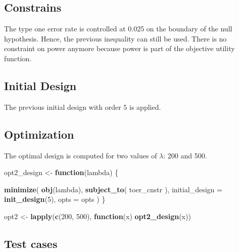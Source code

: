 \documentclass[]{book}
\newenvironment{Shaded}{\begin{snugshade}}{\end{snugshade}}
\newcommand{\ControlFlowTok}[1]{\textcolor[rgb]{0.13,0.29,0.53}{\textbf{#1}}}
\newcommand{\DataTypeTok}[1]{\textcolor[rgb]{0.13,0.29,0.53}{#1}}
\newcommand{\DecValTok}[1]{\textcolor[rgb]{0.00,0.00,0.81}{#1}}
\newcommand{\KeywordTok}[1]{\textcolor[rgb]{0.13,0.29,0.53}{\textbf{#1}}}
\newcommand{\NormalTok}[1]{#1}
\newcommand{\StringTok}[1]{\textcolor[rgb]{0.31,0.60,0.02}{#1}}
\begin{document}
\hypertarget{constrains-11}{%
\subsection{Constrains}\label{constrains-11}}

The type one error rate is controlled at 0.025 on the boundary of the
null hypothesis. Hence, the previous inequality can still be used.
There is no constraint on power anymore because power is part of the
objective utility function.

\hypertarget{initial-design-9}{%
\subsection{Initial Design}\label{initial-design-9}}

The previous initial design with order \(5\) is applied.

\hypertarget{optimization-10}{%
\subsection{Optimization}\label{optimization-10}}

The optimal design is computed for two values of \(\lambda\): 200 and 500.

\begin{Shaded}
\begin{Highlighting}[]
\NormalTok{opt2_design <-}\StringTok{ }\ControlFlowTok{function}\NormalTok{(lambda) \{}

    \KeywordTok{minimize}\NormalTok{(}
        \KeywordTok{obj}\NormalTok{(lambda),}
        \KeywordTok{subject_to}\NormalTok{(}
\NormalTok{            toer_cnstr}
\NormalTok{        ),}
        \DataTypeTok{initial_design =} \KeywordTok{init_design}\NormalTok{(}\DecValTok{5}\NormalTok{),}
        \DataTypeTok{opts =}\NormalTok{ opts}
\NormalTok{    )}
\NormalTok{\}}

\NormalTok{opt2 <-}\StringTok{ }\KeywordTok{lapply}\NormalTok{(}\KeywordTok{c}\NormalTok{(}\DecValTok{200}\NormalTok{, }\DecValTok{500}\NormalTok{), }\ControlFlowTok{function}\NormalTok{(x) }\KeywordTok{opt2_design}\NormalTok{(x))}
\end{Highlighting}
\end{Shaded}

\hypertarget{test-cases-11}{%
\subsection{Test cases}\label{test-cases-11}}
\end{document}
